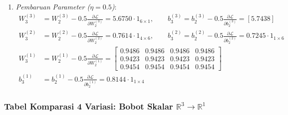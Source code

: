 \documentclass[11pt,a4paper]{article}
\def\mathbf#1{#1}%
\theoremstyle{plain}
\theoremstyle{definition}
\theoremstyle{remark}
\begin{document}
\begin{enumerate}
    \item \textit{Pembaruan Parameter ($\eta = 0.5$)}:
    \begin{align}
        W^{(3)}_3 &= W^{(3)}_2 - 0.5 \frac{\partial \mathcal{L}}{\partial W^{(3)}_2} = 5.6750 \cdot \mathbf{1}_{6 \times 1}, \qquad \mathbf{b}^{(3)}_3 = \mathbf{b}^{(3)}_2 - 0.5 \frac{\partial \mathcal{L}}{\partial \mathbf{b}^{(3)}_2} = [5.7438] \\[0.2em]
        W^{(2)}_3 &= W^{(2)}_2 - 0.5 \frac{\partial \mathcal{L}}{\partial W^{(2)}_2} = 0.7614 \cdot \mathbf{1}_{4 \times 6}, \qquad \mathbf{b}^{(2)}_3 = \mathbf{b}^{(2)}_2 - 0.5 \frac{\partial \mathcal{L}}{\partial \mathbf{b}^{(2)}_2} = 0.7245 \cdot \mathbf{1}_{1 \times 6} \\[0.2em]
        W^{(1)}_3 &= W^{(1)}_2 - 0.5 \frac{\partial \mathcal{L}}{\partial W^{(1)}_2} = \begin{bmatrix}
            0.9486 & 0.9486 & 0.9486 & 0.9486 \\
            0.9423 & 0.9423 & 0.9423 & 0.9423 \\
            0.9454 & 0.9454 & 0.9454 & 0.9454
        \end{bmatrix} \\[0.2em]
        \mathbf{b}^{(1)}_3 &= \mathbf{b}^{(1)}_2 - 0.5 \frac{\partial \mathcal{L}}{\partial \mathbf{b}^{(1)}_2} = 0.8144 \cdot \mathbf{1}_{1 \times 4}
    \end{align}
\end{enumerate}

\clearpage
\subsubsection{Tabel Komparasi 4 Variasi: Bobot Skalar \texorpdfstring{$\mathbb{R}^3 \to \mathbb{R}^1$}{R3 -> R1}}
\label{subsubsec:tabel_skalar_r1}
\end{document}
